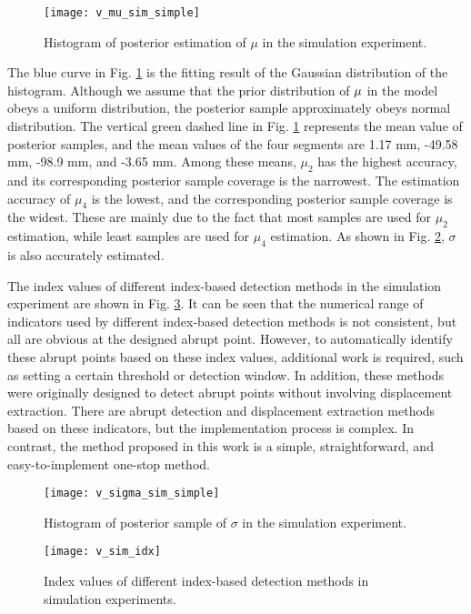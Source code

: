 \documentclass[final,3p,times]{elsarticle}
\begin{document}
	\begin{figure}[htbp]
		\centering
		\texttt{[image: v\_mu\_sim\_simple]}
		\caption{Histogram of posterior estimation of $\mu$ in the simulation experiment.}
		\label{fig_v_mu_sim_simple}
	\end{figure} 
	The blue curve in Fig. \ref{fig_v_mu_sim_simple} is the fitting result of \textcolor{r_s}{the} Gaussian distribution of the histogram.
	Although we assume that the prior distribution of $\bf{\mu}$ in the model obeys a uniform distribution, the posterior sample approximately obeys normal distribution. 
	The vertical green dashed line in Fig. \ref{fig_v_mu_sim_simple} represents the mean value of posterior samples, and the mean values of the four segments are 1.17 mm, -49.58 mm, -98.9 mm, and -3.65 mm.
	Among these means, $\mu_2$ has the highest accuracy, and its corresponding posterior sample coverage is the narrowest. 
	The estimation accuracy of $\mu_4$ is the lowest, and the corresponding posterior sample coverage is the widest. 
	These are mainly due to the fact that most samples are used for $\mu_2$ estimation, while least samples are used for $\mu_4$ estimation. 
	As shown in Fig. \ref{fig_v_sigma_sim_simple}, $\sigma$ is also accurately estimated.
	
	The index values of different index-based detection methods in the simulation experiment are shown in Fig. \ref{fig_v_sim_idx}.
	It can be seen that the numerical range of indicators used by different \textcolor{r_s}{index-based} detection methods is not consistent, but all are obvious at the designed abrupt point.
	However, to automatically identify these abrupt points based on these index values, additional work is required, such as setting a certain threshold  \textcolor{r_s}{or detection window\cite{shen_shortterm2021}}.
	In addition, these methods were originally designed to detect abrupt points without involving displacement extraction.
	There are abrupt detection and displacement extraction methods based on these indicators, but the implementation process is complex\cite{shen_shortterm2021}.
	In contrast, the method proposed in this work is a simple, straightforward, and easy-to-implement one-stop method.
	\begin{figure}[htbp]
		\centering
		\texttt{[image: v\_sigma\_sim\_simple]}
		\caption{Histogram of posterior sample of $\sigma$ in the simulation experiment.}
		\label{fig_v_sigma_sim_simple}
	\end{figure} 
	\begin{figure}[htbp]
	\centering
	\texttt{[image: v\_sim\_idx]}
	\caption{Index values of different index-based detection methods in simulation experiments.}
	\label{fig_v_sim_idx}
	\end{figure} 
\end{document}
